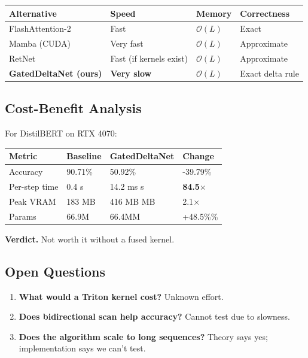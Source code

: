 \begin{table}[H]
\centering
\small
\begin{tabular}{llll}
\toprule
\textbf{Alternative} & \textbf{Speed} & \textbf{Memory} & \textbf{Correctness} \\
\midrule
FlashAttention-2 & Fast & $\mathcal{O}(L)$ & Exact \\
Mamba (CUDA) & Very fast & $\mathcal{O}(L)$ & Approximate \\
RetNet & Fast (if kernels exist) & $\mathcal{O}(L)$ & Approximate \\
\textbf{GatedDeltaNet (ours)} & \textbf{Very slow} & $\mathcal{O}(L)$ & Exact delta rule \\
\bottomrule
\end{tabular}
\end{table}

\subsection{Cost-Benefit Analysis}

For DistilBERT on RTX 4070:

\begin{table}[H]
\centering
\small
\begin{tabular}{llll}
\toprule
\textbf{Metric} & \textbf{Baseline} & \textbf{GatedDeltaNet} & \textbf{Change} \\
\midrule
Accuracy & 90.71\% & 50.92\% & -39.79\% \\
Per-step time & 0.4 s & 14.2 ms s & \textbf{84.5$\times$} \\
Peak VRAM & 183 MB & 416 MB MB & 2.1$\times$ \\
Params & 66.9M & 66.4MM & +48.5\%\% \\
\bottomrule
\end{tabular}
\end{table}

\textbf{Verdict.} Not worth it without a fused kernel.

\subsection{Open Questions}

\begin{enumerate}
\item \textbf{What would a Triton kernel cost?} Unknown effort.
\item \textbf{Does bidirectional scan help accuracy?} Cannot test due to slowness.
\item \textbf{Does the algorithm scale to long sequences?} Theory says yes;
  implementation says we can't test.

\end{enumerate}
